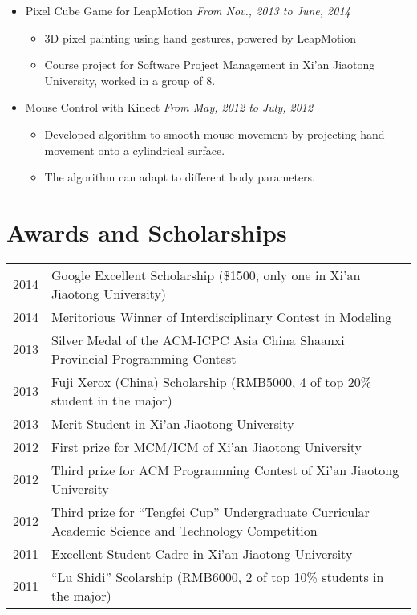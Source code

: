 \documentclass[letterpaper,11pt]{article}
\begin{document}
\begin{itemize}
    \item Pixel Cube Game for LeapMotion \hfill \textit{From Nov., 2013 to June, 2014}
    \begin{itemize}
        \item 3D pixel painting using hand gestures, powered by LeapMotion
        \item Course project for Software Project Management in Xi'an Jiaotong University, worked in a group
of 8.
    \end{itemize}

    \item Mouse Control with Kinect \hfill \textit{From May, 2012 to July, 2012}
    \begin{itemize}
        \item Developed algorithm to smooth mouse movement by projecting hand movement onto a 
cylindrical surface.
        \item The algorithm can adapt to different body parameters.
    \end{itemize}

\end{itemize}


\section{Awards and Scholarships}

\begin{tabular}{lp{15cm}}
    2014 & Google Excellent Scholarship (\$1500, only one in Xi'an Jiaotong University) \\
    2014 & Meritorious Winner of Interdisciplinary Contest in Modeling \\
    2013 & Silver Medal of the ACM-ICPC Asia China
            \newline Shaanxi Provincial Programming Contest \\
    2013 & Fuji Xerox (China) Scholarship (RMB5000, 4 of top 20\% student in the major) \\
    2013 & Merit Student in Xi'an Jiaotong University \\
    2012 & First prize for MCM/ICM of Xi'an Jiaotong University \\
    2012 & Third prize for ACM Programming Contest of Xi'an Jiaotong University \\
    2012 & Third prize for ``Tengfei Cup'' Undergraduate
            \newline Curricular Academic Science and Technology Competition \\
    2011 & Excellent Student Cadre in Xi'an Jiaotong University  \\
    2011 & ``Lu Shidi'' Scolarship (RMB6000, 2 of top 10\% students in the major)
\end{tabular}
\end{document}
